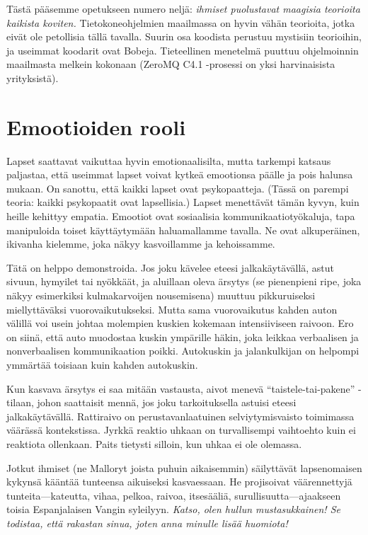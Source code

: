Tästä pääsemme opetukseen numero neljä: \emph{ihmiset puolustavat maagisia teorioita kaikista koviten.} Tietokoneohjelmien maailmassa on hyvin vähän teorioita, jotka eivät ole petollisia tällä tavalla. Suurin osa koodista perustuu mystisiin teorioihin, ja useimmat koodarit ovat Bobeja. Tieteellinen menetelmä puuttuu ohjelmoinnin maailmasta melkein kokonaan (ZeroMQ C4.1 -prosessi on yksi harvinaisista yrityksistä).

\section{Emootioiden rooli}

Lapset saattavat vaikuttaa hyvin emotionaalisilta, mutta tarkempi katsaus paljastaa, että useimmat lapset voivat kytkeä emootionsa päälle ja pois halunsa mukaan. On sanottu, että kaikki lapset ovat psykopaatteja. (Tässä on parempi teoria: kaikki psykopaatit ovat lapsellisia.) Lapset menettävät tämän kyvyn, kuin heille kehittyy empatia. Emootiot ovat sosiaalisia kommunikaatiotyökaluja, tapa manipuloida toiset käyttäytymään haluamallamme tavalla. Ne ovat alkuperäinen, ikivanha kielemme, joka näkyy kasvoillamme ja kehoissamme.

Tätä on helppo demonstroida. Jos joku kävelee eteesi jalkakäytävällä, astut sivuun, hymyilet tai nyökkäät, ja aluillaan oleva ärsytys (se pienenpieni ripe, joka näkyy esimerkiksi kulmakarvoijen nousemisena) muuttuu pikkuruiseksi miellyttäväksi vuorovaikutukseksi. Mutta sama vuorovaikutus kahden auton välillä voi usein johtaa molempien kuskien kokemaan intensiiviseen raivoon. Ero on siinä, että auto muodostaa kuskin ympärille häkin, joka leikkaa verbaalisen ja nonverbaalisen kommunikaation poikki. Autokuskin ja jalankulkijan on helpompi ymmärtää toisiaan kuin kahden autokuskin.

Kun kasvava ärsytys ei saa mitään vastausta, aivot menevä ``taistele-tai-pakene'' -tilaan, johon saattaisit mennä, jos joku tarkoituksella astuisi eteesi jalkakäytävällä. Rattiraivo on perustavanlaatuinen selviytymisvaisto toimimassa väärässä kontekstissa. Jyrkkä reaktio uhkaan on turvallisempi vaihtoehto kuin ei reaktiota ollenkaan. Paits tietysti silloin, kun uhkaa ei ole olemassa.

Jotkut ihmiset (ne Malloryt joista puhuin aikaisemmin) säilyttävät lapsenomaisen kykynsä kääntää tunteensa aikuiseksi kasvaessaan. He projisoivat väärennettyjä tunteita---kateutta, vihaa, pelkoa, raivoa, itsesääliä, surullisuutta---ajaakseen toisia Espanjalaisen Vangin syleilyyn. \emph{Katso, olen hullun mustasukkainen! Se todistaa, että rakastan sinua, joten anna minulle lisää huomiota!}

